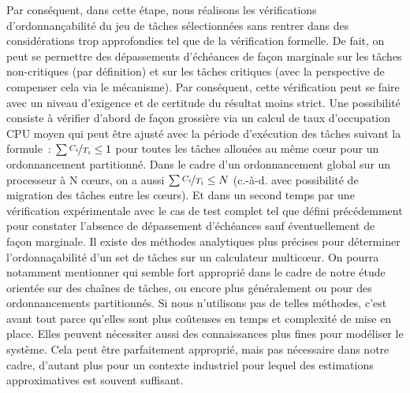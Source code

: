 \documentclass[french, a4paper, 11pt, twoside, pdftex]{StyleThese}
\begin{document}
		Par conséquent, dans cette étape, nous réalisons les vérifications d'ordonnançabilité du jeu de tâches sélectionnées sans rentrer dans des considérations trop approfondies tel que de la vérification formelle. De fait, on peut se permettre des dépassements d'échéances de façon marginale sur les tâches non-critiques (par définition) et sur les tâches critiques (avec la perspective de compenser cela via le mécanisme). Par conséquent, cette vérification peut se faire avec un niveau d'exigence et de certitude du résultat moins strict. Une possibilité consiste à vérifier d'abord de façon grossière via un calcul de taux d'occupation CPU moyen qui peut être ajusté avec la période d'exécution des tâches suivant la formule~:	$ \sum{\nicefrac{C_i}{T_i}} \leq 1 $ pour toutes les tâches allouées au même cœur pour un ordonnancement partitionné. Dans le cadre d'un ordonnancement global sur un processeur à N cœurs, on a aussi $ \sum{\nicefrac{C_i}{T_i}} \leq N $ (c.-à-d. avec possibilité de migration des tâches entre les cœurs). Et dans un second temps par une vérification expérimentale avec le cas de test complet tel que défini précédemment pour constater l'absence de dépassement d'échéances sauf éventuellement de façon marginale. Il existe des méthodes analytiques plus précises pour déterminer l'ordonnaçabilité d'un set de tâches sur un calculateur multicœur. On pourra notamment mentionner \cite{melani_schedulability_2016} qui semble fort approprié dans le cadre de notre étude orientée sur des chaînes de tâches, ou encore plus généralement \cite{chen_efficient_2014} ou \cite{han_multicore_2018} pour des ordonnancements partitionnés. Si nous n'utilisons pas de telles méthodes, c'est avant tout parce qu'elles sont plus coûteuses en temps et complexité de mise en place. Elles peuvent nécessiter aussi des connaissances plus fines pour modéliser le système. Cela peut être parfaitement approprié, mais pas nécessaire dans notre cadre, d'autant plus pour un contexte industriel pour lequel des estimations approximatives est souvent suffisant.
			
\end{document}
